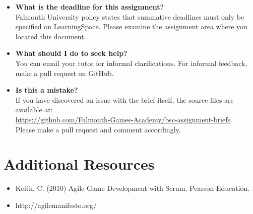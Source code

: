 \documentclass{../fal_assignment}
\begin{document}
\begin{itemize}
	\item 	\textbf{What is the deadline for this assignment?} \\ 
    		Falmouth University policy states that summative deadlines must only be specified on LearningSpace. Please examine the assignment area where you located this document.
    		
	\item 	\textbf{What should I do to seek help?} \\ 
    		You can email your tutor for informal clarifications. For informal feedback, make a pull request on GitHub. 
    		
    	\item 	\textbf{Is this a mistake?} \\ 	
    		If you have discovered an issue with the brief itself, the source files are available at: \\
    		\url{https://github.com/Falmouth-Games-Academy/bsc-assignment-briefs}.\\
    		 Please make a pull request and comment accordingly.
\end{itemize}

\section*{Additional Resources}

\begin{itemize}
    \item Keith, C. (2010) Agile Game Development with Scrum. Pearson Education.
    \item http://agilemanifesto.org/
\end{itemize}
\end{document}
